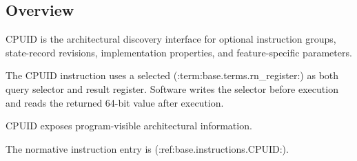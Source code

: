\subsection{Overview}
CPUID is the architectural discovery interface for optional instruction groups, state-record revisions,
implementation properties, and feature-specific parameters.

The CPUID instruction uses a selected (:term:base.terms.rn_register:) as both query selector and result register. Software writes the
selector before execution and reads the returned 64-bit value after execution.

CPUID exposes program-visible architectural information.

The normative instruction entry is (:ref:base.instructions.CPUID:).\par
